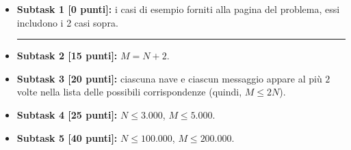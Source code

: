   \begin{itemize}
  \item \textbf{Subtask 1 [0 punti]:} i casi di esempio forniti alla pagina del problema, essi includono i 2 casi sopra.
      \vspace{-0.6cm}
       \begin{center}
      \rule{0.5\textwidth}{0.4pt} \hfill  \hfill \hfill
       \end{center}
      \vspace{-0.6cm}      
    \item \textbf{Subtask 2 [15 punti]:} $M=N+2$.
    \item \textbf{Subtask 3 [20 punti]:} ciascuna nave e ciascun messaggio appare al più $2$ volte nella lista delle possibili corrispondenze (quindi, $M \leq 2N$).
    \item \textbf{Subtask 4 [25 punti]:} $N \leq  3.000$, $M \leq  5.000$.
    \item \textbf{Subtask 5 [40 punti]:} $N \leq  100.000$, $M \leq  200.000$.
  \end{itemize}

